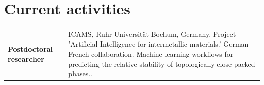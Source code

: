 \vspace{-0.5cm}
\section{Current activities}
\vspace{-0.5cm}
\begin{tabular}{p{6cm} p{11cm}}
	\hfill\textbf{Postdoctoral researcher} 
	& ICAMS, Ruhr-Universität Bochum, Germany. Project 'Artificial Intelligence for intermetallic materials.' German-French collaboration. Machine learning workflows for predicting the relative stability of topologically close-packed phases.. \\
\end{tabular}

\pagebreak

\pagebreak

% 
%
%
%

